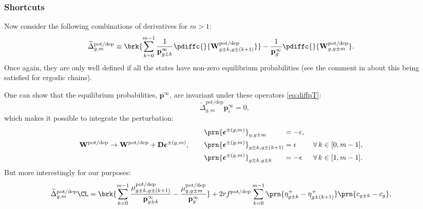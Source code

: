 \documentclass{article} %
\newcommand{\pr}{\mathbf{p}}
\newcommand{\eq}{\pr^\infty}
\newcommand{\D}{\mathbf{D}}
\newcommand{\W}{\mathbf{W}}
\newcommand{\potdep}{^{\text{pot/dep}}}
\begin{document}
\subsubsection{Shortcuts}\label{sec:shortcuts}

Now consider the following combinations of derivatives for $m>1$:
%
\begin{align}
\label{eq:shortcutderiv}
    \widetilde{\Delta}\potdep _{g,m} &\equiv
      \brk{ \sum_{k=0}^{m-1} \frac{1}{\eq_{g\pm k}} \pdiffc{}{\W\potdep _{g\pm k,g\pm(k+1)}} }
      - \frac{1}{\eq_g} \pdiffc{}{\W\potdep _{g,g\pm m}}.
\end{align}
%
Once again, they are only well defined if all the states have non-zero equilibrium probabilities (see the comment in  about this being satisfied for ergodic chains).

One can show that the equilibrium probabilities, $\eq$, are invariant under these operators \eqref{eq:diffpT}:
%
\begin{equation}\label{eq:shortcutprob}
  \widetilde{\Delta}\potdep _{g,m} \eq_i = 0,
\end{equation}
%
which makes it possible to integrate the perturbation:
%
\begin{equation}\label{eq:shortcutfinite}
  \W\potdep  \to \W\potdep  + \D\boldsymbol{\epsilon}^{\pm(g,m)},
  \qquad
  \begin{aligned}
    &\prn{\boldsymbol{\epsilon}^{\pm(g,m)}}_{g,g\pm m}
      &\!\!\!\!\!\!&= -\epsilon,\\
    &\prn{\boldsymbol{\epsilon}^{\pm(g,m)}}_{g\pm k,g\pm(k+1)}
      &\!\!\!\!\!\!&= \epsilon
        &\;
        &\forall\, k \in [0,m-1],\\
    &\prn{\boldsymbol{\epsilon}^{\pm(g,m)}}_{g\pm k,g\pm k}
      &\!\!\!\!\!\!&= -\epsilon
        &
        &\forall\, k \in [1,m-1].
  \end{aligned}
\end{equation}
%
But more interestingly for our purposes:
%
\begin{align}
\label{eq:shortcutarea}
    \widetilde{\Delta}\potdep _{g,m}\CL &=
      \brk{ \sum_{k=0}^{m-1} \frac{\mu\potdep _{g\pm k,g\pm(k+1)}}{\eq_{g\pm k}}
      - \frac{\mu\potdep _{g,g\pm m}}{\eq_g}}
      + 2rf\potdep  \sum_{k=0}^{m-1} \prn{\eta^+_{g\pm k} - \eta^+_{g\pm(k+1)}} \prn{c_{g\pm k} - c_{g}},
\end{align}
%
\end{document}
